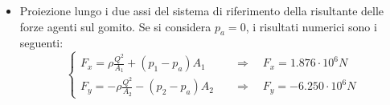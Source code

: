\begin{itemize}
  \item Proiezione lungo i due assi del sistema di riferimento della risultante delle forze agenti sul gomito.
  Se si considera $p_a = 0$, i risultati numerici sono i seguenti:
  \begin{equation}
  \begin{cases}
    F_x = \rho \frac{Q^2}{A_1} + (p_1 - p_a)A_1  & \quad \Rightarrow \quad   F_x = 1.876 \cdot 10^6 N  \\
    F_y = -  \rho \frac{Q^2}{A_2} - (p_2 - p_a)A_2  & \quad \Rightarrow \quad   F_y =-6.250 \cdot 10^6 N
  \end{cases}
  \end{equation}
\end{itemize}

